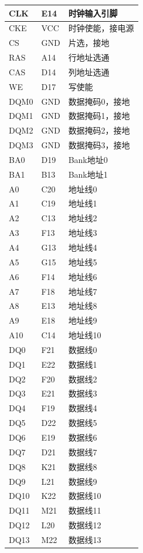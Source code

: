 \documentclass[12pt]{article}
\begin{document}
\begin{longtable}{|C{2cm}|C{3cm}|C{3cm}|}
CLK & E14 & 时钟输入引脚 \\
\hline
CKE & VCC & 时钟使能，接电源 \\
\hline
CS & GND & 片选，接地 \\
\hline
RAS & A14 & 行地址选通 \\
\hline
CAS & D14 & 列地址选通 \\
\hline
WE & D17 & 写使能 \\
\hline
DQM0 & GND & 数据掩码0，接地 \\
\hline
DQM1 & GND & 数据掩码1，接地 \\
\hline
DQM2 & GND & 数据掩码2，接地 \\
\hline
DQM3 & GND & 数据掩码3，接地 \\
\hline
BA0 & D19 & Bank地址0 \\
\hline
BA1 & B13 & Bank地址1 \\
\hline
A0 & C20 & 地址线0 \\
\hline
A1 & C19 & 地址线1 \\
\hline
A2 & C13 & 地址线2 \\
\hline
A3 & F13 & 地址线3 \\
\hline
A4 & G13 & 地址线4 \\
\hline
A5 & G15 & 地址线5 \\
\hline
A6 & F14 & 地址线6 \\
\hline
A7 & F18 & 地址线7 \\
\hline
A8 & E13 & 地址线8 \\
\hline
A9 & E18 & 地址线9 \\
\hline
A10 & C14 & 地址线10 \\
\hline
DQ0 & F21 & 数据线0 \\
\hline
DQ1 & E22 & 数据线1 \\
\hline
DQ2 & F20 & 数据线2 \\
\hline
DQ3 & E21 & 数据线3 \\
\hline
DQ4 & F19 & 数据线4 \\
\hline
DQ5 & D22 & 数据线5 \\
\hline
DQ6 & E19 & 数据线6 \\
\hline
DQ7 & D21 & 数据线7 \\
\hline
DQ8 & K21 & 数据线8 \\
\hline
DQ9 & L21 & 数据线9 \\
\hline
DQ10 & K22 & 数据线10 \\
\hline
DQ11 & M21 & 数据线11 \\
\hline
DQ12 & L20 & 数据线12 \\
\hline
DQ13 & M22 & 数据线13 \\

\end{longtable}
\end{document}
